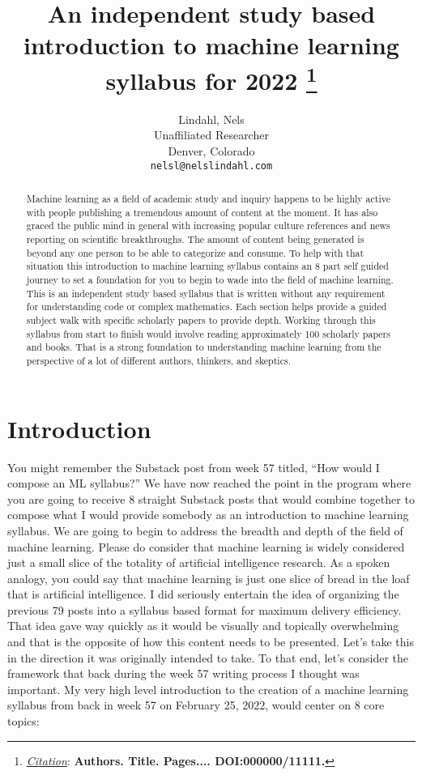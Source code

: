 \documentclass{article}
\title{An independent study based introduction to machine learning syllabus for 2022
\thanks{\textit{\underline{Citation}}: 
\textbf{Authors. Title. Pages.... DOI:000000/11111.}} 
}
\author{
  Lindahl, Nels \\
  Unaffiliated Researcher \\
  Denver, Colorado\\
   \texttt{nelsl@nelslindahl.com} \\
}
\begin{document}
\maketitle


\begin{abstract}
Machine learning as a field of academic study and inquiry happens to be highly active with people publishing a tremendous amount of content at the moment. It has also graced the public mind in general with increasing popular culture references and news reporting on scientific breakthroughs. The amount of content being generated is beyond any one person to be able to categorize and consume. To help with that situation this introduction to machine learning syllabus contains an 8 part self guided journey to set a foundation for you to begin to wade into the field of machine learning. This is an independent study based syllabus that is written without any requirement for understanding code or complex mathematics. Each section helps provide a guided subject walk with specific scholarly papers to provide depth. Working through this syllabus from start to finish would involve reading approximately 100 scholarly papers and books. That is a strong foundation to understanding machine learning from the perspective of a lot of different authors, thinkers, and skeptics.     
\end{abstract}




\section{Introduction}
You might remember the Substack post from week 57 titled, “How would I compose an ML syllabus?” We have now reached the point in the program where you are going to receive 8 straight Substack posts that would combine together to compose what I would provide somebody as an introduction to machine learning syllabus. We are going to begin to address the breadth and depth of the field of machine learning. Please do consider that machine learning is widely considered just a small slice of the totality of artificial intelligence research. As a spoken analogy, you could say that machine learning is just one slice of bread in the loaf that is artificial intelligence. I did seriously entertain the idea of organizing the previous 79 posts into a syllabus based format for maximum delivery efficiency. That idea gave way quickly as it would be visually and topically overwhelming and that is the opposite of how this content needs to be presented. Let’s take this in the direction it was originally intended to take. To that end, let’s consider the framework that back during the week 57 writing process I thought was important. My very high level introduction to the creation of a machine learning syllabus from back in week 57 on February 25, 2022, would center on 8 core topics:
\end{document}

